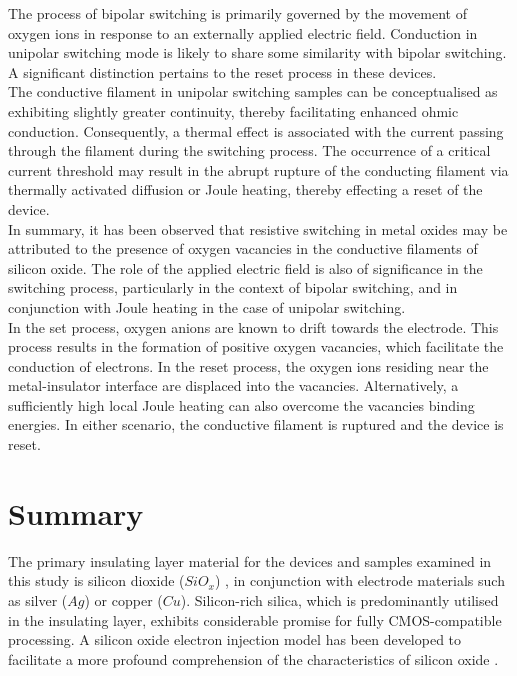 \noindent The process of bipolar switching is primarily governed by the movement of oxygen ions in response to an externally applied electric field. Conduction in unipolar switching mode is likely to share some similarity with bipolar switching. A significant distinction pertains to the reset process in these devices.\\

\noindent The conductive filament in unipolar switching samples can be conceptualised as exhibiting slightly greater continuity, thereby facilitating enhanced ohmic conduction. Consequently, a thermal effect is associated with the current passing through the filament during the switching process. The occurrence of a critical current threshold may result in the abrupt rupture of the conducting filament via thermally activated diffusion or Joule heating, thereby effecting a reset of the device.\\

\noindent In summary, it has been observed that resistive switching in metal oxides may be attributed to the presence of oxygen vacancies in the conductive filaments of silicon oxide. The role of the applied electric field is also of significance in the switching process, particularly in the context of bipolar switching, and in conjunction with Joule heating in the case of unipolar switching.\\

\noindent In the set process, oxygen anions are known to drift towards the electrode. This process results in the formation of positive oxygen vacancies, which facilitate the conduction of electrons. In the reset process, the oxygen ions residing near the metal-insulator interface are displaced into the vacancies. Alternatively, a sufficiently high local Joule heating can also overcome the vacancies binding energies. In either scenario, the conductive filament is ruptured and the device is reset.


\section[Summary]{Summary}

The primary insulating layer material for the devices and samples examined in this study is silicon dioxide ($SiO_x$) \cite{mehonic2012resistive}, in conjunction with electrode materials such as silver ($Ag$) or copper ($Cu$). Silicon-rich silica, which is predominantly utilised in the insulating layer, exhibits considerable promise for fully CMOS-compatible processing. A silicon oxide electron injection model has been developed to facilitate a more profound comprehension of the characteristics of silicon oxide \cite{gao2016mechanism}. \\

